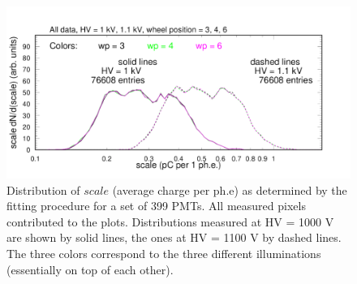 \begin{figure}[hbt]
	\centering
	\includegraphics[width=0.95\linewidth]{figures/pglobal_sc.pdf}
	\caption{Distribution of $scale$ (average charge per ph.e) as determined by the fitting procedure for a set of 399 PMTs. All measured pixels contributed to the plots. Distributions measured at HV = 1000 V are shown by solid lines, the ones at HV = 1100 V by dashed lines. The three colors correspond to the three different illuminations (essentially on top of each other).
	}
	\label{fig:pglobal_sc}
\end{figure}

